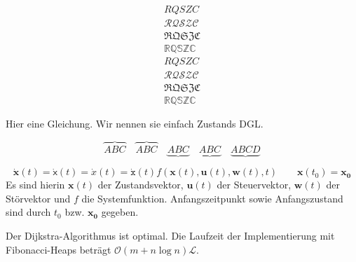 \documentclass[%
  ngerman,%
]%
{tudscrreprtnew}
\begin{document}
\date{19.02.2015}


\begin{align}
RQSZC\\
\mathcal{RQSZC}\\
\mathfrak{RQSZC}\\
\mathbb{RQSZC}
\end{align}
\boldmath
\begin{align}
RQSZC\\
\mathcal{RQSZC}\\
\mathfrak{RQSZC}\\
\mathbb{RQSZC}
\end{align}

Hier eine Gleichung. Wir nennen sie einfach Zustands DGL.

\[\overbrace{ABC}\quad\overbrace{ABC}\quad\underbrace{ABC}\quad
\underbrace{ABC}\quad \underbrace{ABCD}\]

\begin{equation}\label{eq:ZustandsDGL}
  \mathbf{\dot x}(t)=\mathsf{\dot x}(t)=\mathit{\dot x}(t)=\mathtt{\dot x}(t)
  f \left(\mathbf{x}(t), \mathbf{u}(t), \mathbf{w}(t), 
  t\right) \qquad \mathbf{x}(t_0) = \mathbf{x_0}
\end{equation}
%
Es sind hierin $\mathbf{x}(t)$ der Zustandsvektor, $\mathbf{u}(t)$ der
Steuervektor, $\mathbf{w}(t)$ der Störvektor und $f$ die Systemfunktion. 
Anfangszeitpunkt sowie Anfangszustand sind durch $t_0$ bzw. $\mathbf{x_0}$ 
gegeben.

Der Dijkstra-Algorithmus ist optimal. Die Laufzeit der Implementierung mit 
Fibonacci-Heaps beträgt $\mathcal{O}(m+n\log n)\mathcal{L}$.

\blindtext

\end{document}
